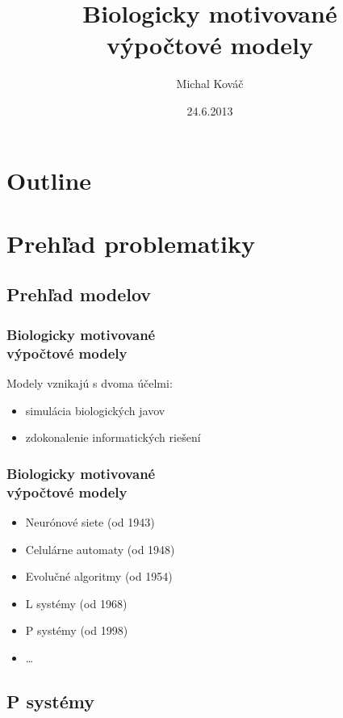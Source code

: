 \documentclass{beamer}
\title{Biologicky motivované \\výpočtové modely}
\author{Michal Kováč}
\institute{FMFI UK}
\date{24.6.2013}
\begin{document}
\begin{frame}[t]
\titlepage
\end{frame}

\section*{Outline}
\begin{frame}
\tableofcontents
\end{frame}

\section{Prehľad problematiky} %
\label{sec:prehlad_problematiky}

\subsection{Prehľad modelov} %
\label{sub:prehlad_modelov}

\begin{frame}[t]\frametitle{Biologicky motivované\\výpočtové modely}
Modely vznikajú s dvoma účelmi:
\begin{itemize}
  \item simulácia biologických javov
  \item zdokonalenie informatických riešení
\end{itemize}
\end{frame}

\begin{frame}[t]\frametitle{Biologicky motivované\\výpočtové modely}
\begin{itemize}
  \item Neurónové siete (od 1943)
  \item Celulárne automaty (od 1948)
  \item Evolučné algoritmy (od 1954)
  \item L systémy (od 1968)
  \item P systémy (od 1998) \cite{Paun98}
  \item \dots
\end{itemize}
\end{frame}


\subsection{P systémy} %
\label{sub:p_systemy}
\end{document}
